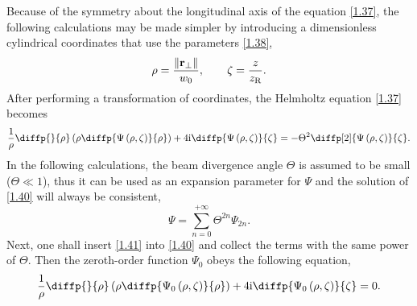 Because of the symmetry about the longitudinal axis of the equation \ref{1.37}, the following calculations may be made simpler by introducing a dimensionless cylindrical coordinates that use the parameters \ref{1.38},
\begin{equation}
\label{1.39}
\rho = \frac{\lVert\mathbf{r_\bot}\rVert}{w_0}, \qquad \zeta = \frac{z}{z_{\mathrm{R}}}.
\end{equation}
After performing a transformation of coordinates, the Helmholtz equation \ref{1.37} becomes 
\begin{equation}
\label{1.40}
\frac{1}{\rho} \diffp{}{\rho}\left(\rho \diffp{\Psi \left(\rho, \zeta \right)}{\rho} \right) + 4 \i \diffp{\Psi \left(\rho, \zeta \right)}{\zeta}  = - \Theta^2 \diffp[2]{\Psi \left(\rho, \zeta \right)}{\zeta}.
\end{equation}
In the following calculations, the beam divergence angle $ \Theta $ is assumed to be small ($ \Theta \ll 1 $), thus it can be used as an expansion parameter for $ \Psi $ and the solution of \ref{1.40} will always be consistent,
\begin{equation}
\label{1.41}
\Psi = \sum_{n = 0}^{+\infty} \Theta^{2n} \Psi_{2n}.
\end{equation}
Next, one shall insert \ref{1.41} into \ref{1.40} and collect the terms with the same power of $ \Theta $. Then the zeroth-order function $ \Psi_0 $ obeys the following equation,
\begin{equation}
\label{1.42}
\frac{1}{\rho} \diffp{}{\rho}\left(\rho \diffp{\Psi_0 \left(\rho, \zeta \right)}{\rho} \right) + 4 \i \diffp{\Psi_0\left(\rho, \zeta \right)}{\zeta} = 0.
\end{equation}

